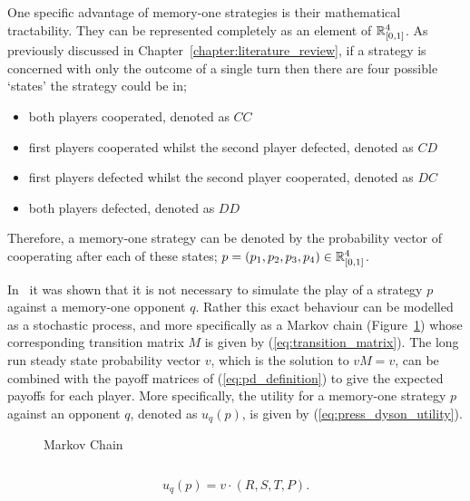One specific advantage of memory-one strategies is their mathematical
tractability. They can be represented completely as an element of \(\mathbb{R}^{4}_{[0, 1]}\).
As previously discussed in Chapter~\ref{chapter:literature_review},
if a strategy is concerned with only the outcome of a single turn then there are
four possible `states' the strategy could be in;

\begin{itemize}
    \item both players cooperated, denoted as \(CC\)
    \item first players cooperated whilst the second player defected, denoted as \(CD\)
    \item first players defected whilst the second player cooperated, denoted as \(DC\)
    \item both players defected, denoted as \(DD\)
\end{itemize}

Therefore, a memory-one strategy can be denoted by the probability vector of
cooperating after each of these states; \(p=(p_1, p_2, p_3, p_4) \in \mathbb{R}_{[0,1]}
^ 4\).

In~\cite{Nowak1989} it was shown that it is not necessary to simulate the play
of a strategy $p$ against a memory-one opponent $q$. Rather this exact behaviour
can be modelled as a stochastic process, and more specifically as a Markov chain
(Figure~\ref{fig:markov_chain}) whose corresponding transition matrix \(M\) is
given by (\ref{eq:transition_matrix}). The long run steady state probability
vector \(v\), which is the solution to \(v M = v\), can be
combined with the payoff matrices of (\ref{eq:pd_definition}) to give the expected
payoffs for each player. More specifically, the utility for a memory-one
strategy \(p\) against an opponent \(q\), denoted as \(u_q(p)\), is given by
(\ref{eq:press_dyson_utility}).

\begin{figure}
    \centering
    
    \caption{Markov Chain}
    \label{fig:markov_chain}
\end{figure}

\begin{equation}\label{eq:transition_matrix}
    
\end{equation}


\begin{equation}\label{eq:press_dyson_utility}
    u_q(p) = v \cdot (R, S, T, P).
\end{equation}

